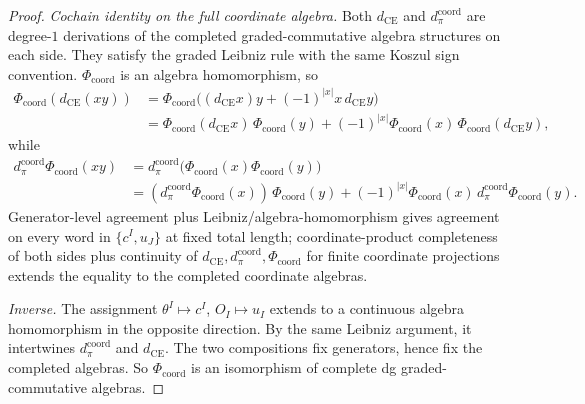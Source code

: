 \documentclass[11pt]{memoir}
\begin{document}
\begin{proof}
  \emph{Cochain identity on the full coordinate algebra.} Both
  \(d_{\mathrm{CE}}\) and \(d_\pi^{\mathrm{coord}}\) are degree-\(1\) derivations of the
  completed graded-commutative algebra structures on each side. They
	  satisfy the graded Leibniz rule with the same Koszul sign
	  convention. \(\Phi_{\mathrm{coord}}\) is an algebra homomorphism, so
	  \begin{align*}
	    \Phi_{\mathrm{coord}}(d_{\mathrm{CE}}(xy))
	    &=
	    \Phi_{\mathrm{coord}}\bigl((d_{\mathrm{CE}}x)y
	      +(-1)^{|x|}x\,d_{\mathrm{CE}}y\bigr)\\
	    &=
	    \Phi_{\mathrm{coord}}(d_{\mathrm{CE}}x)\,
	    \Phi_{\mathrm{coord}}(y)
	    +(-1)^{|x|}\Phi_{\mathrm{coord}}(x)\,
	    \Phi_{\mathrm{coord}}(d_{\mathrm{CE}}y),
	  \end{align*}
	  while
	  \begin{align*}
		    d_\pi^{\mathrm{coord}}\Phi_{\mathrm{coord}}(xy)
	    &=
		    d_\pi^{\mathrm{coord}}\bigl(\Phi_{\mathrm{coord}}(x)
	      \Phi_{\mathrm{coord}}(y)\bigr)\\
	    &=
		    (d_\pi^{\mathrm{coord}}\Phi_{\mathrm{coord}}(x))\,
	    \Phi_{\mathrm{coord}}(y)
	    +(-1)^{|x|}\Phi_{\mathrm{coord}}(x)\,
		    d_\pi^{\mathrm{coord}}\Phi_{\mathrm{coord}}(y).
	  \end{align*}
  Generator-level agreement plus Leibniz/algebra-homomorphism gives
  agreement on every word in $\{c^I,u_J\}$ at fixed total length;
  coordinate-product completeness of both sides plus continuity of
	  \(d_{\mathrm{CE}}, d_\pi^{\mathrm{coord}},\Phi_{\mathrm{coord}}\) for finite coordinate
  projections extends the equality to the completed coordinate algebras.

  \emph{Inverse.} The assignment $\theta^I\mapsto c^I$,
  $O_I\mapsto u_I$ extends to a continuous algebra homomorphism in the
  opposite direction. By the same Leibniz argument, it intertwines
	  \(d_\pi^{\mathrm{coord}}\) and \(d_{\mathrm{CE}}\). The two compositions fix generators,
	  hence fix the completed algebras. So \(\Phi_{\mathrm{coord}}\) is an isomorphism of
  complete dg graded-commutative algebras.


\end{proof}
\end{document}
